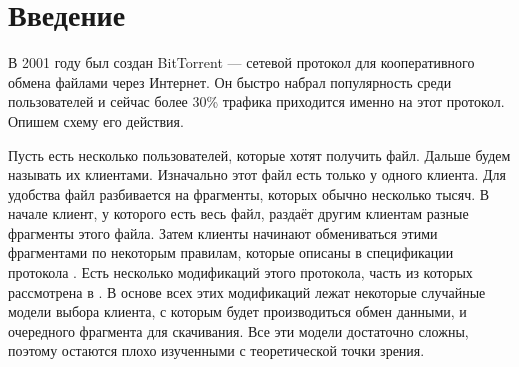 \documentclass{matmex-diploma-custom}
\theoremstyle{named}
\begin{document}
\maketitle
	
\renewcommand{\contentsname}{Оглавление}
\tableofcontents
\newpage

\section*{Введение}
В 2001 году был создан BitTorrent --- сетевой протокол для кооперативного обмена файлами через Интернет.
Он быстро набрал популярность среди пользователей и сейчас более 30\% трафика приходится именно на этот протокол.
Опишем схему его действия.

Пусть есть несколько пользователей, которые хотят получить файл. Дальше будем называть их клиентами.
Изначально этот файл есть только у одного клиента. 
Для удобства файл разбивается на фрагменты, которых обычно несколько тысяч.
В начале клиент, у которого есть весь файл, раздаёт другим клиентам разные фрагменты этого файла.
Затем клиенты начинают обмениваться этими фрагментами по некоторым правилам, 
которые описаны в спецификации протокола \cite{spec}.
Есть несколько модификаций этого протокола, часть из которых рассмотрена в \cite{cool}.
В основе всех этих модификаций лежат некоторые случайные модели выбора клиента, 
с которым будет производиться обмен данными, и очередного фрагмента для скачивания. 
Все эти модели достаточно сложны, поэтому остаются плохо изученными с теоретической точки зрения.
\end{document}
